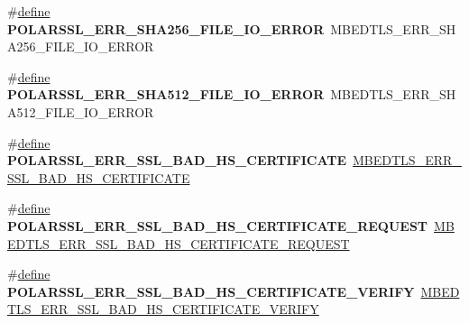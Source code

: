 \begin{DoxyCompactItemize}
\item 
\mbox{\label{compat-1_83_8h_a3aefddbb99ed99898d7ccd1d58301205}} 
\#\hyperlink{structdefine}{define} {\bfseries P\+O\+L\+A\+R\+S\+S\+L\+\_\+\+E\+R\+R\+\_\+\+S\+H\+A256\+\_\+\+F\+I\+L\+E\+\_\+\+I\+O\+\_\+\+E\+R\+R\+OR}~M\+B\+E\+D\+T\+L\+S\+\_\+\+E\+R\+R\+\_\+\+S\+H\+A256\+\_\+\+F\+I\+L\+E\+\_\+\+I\+O\+\_\+\+E\+R\+R\+OR
\item 
\mbox{\label{compat-1_83_8h_a245abc0d05dcfa853d18d20a28d19ec2}} 
\#\hyperlink{structdefine}{define} {\bfseries P\+O\+L\+A\+R\+S\+S\+L\+\_\+\+E\+R\+R\+\_\+\+S\+H\+A512\+\_\+\+F\+I\+L\+E\+\_\+\+I\+O\+\_\+\+E\+R\+R\+OR}~M\+B\+E\+D\+T\+L\+S\+\_\+\+E\+R\+R\+\_\+\+S\+H\+A512\+\_\+\+F\+I\+L\+E\+\_\+\+I\+O\+\_\+\+E\+R\+R\+OR
\item 
\mbox{\label{compat-1_83_8h_abdc6f709e309ee39f6f1b085ee941a55}} 
\#\hyperlink{structdefine}{define} {\bfseries P\+O\+L\+A\+R\+S\+S\+L\+\_\+\+E\+R\+R\+\_\+\+S\+S\+L\+\_\+\+B\+A\+D\+\_\+\+H\+S\+\_\+\+C\+E\+R\+T\+I\+F\+I\+C\+A\+TE}~\hyperlink{ssl_8h_a99d5367b23365159412220ffd9aad20f}{M\+B\+E\+D\+T\+L\+S\+\_\+\+E\+R\+R\+\_\+\+S\+S\+L\+\_\+\+B\+A\+D\+\_\+\+H\+S\+\_\+\+C\+E\+R\+T\+I\+F\+I\+C\+A\+TE}
\item 
\mbox{\label{compat-1_83_8h_a295157be7847f73e569ac41fb81faa08}} 
\#\hyperlink{structdefine}{define} {\bfseries P\+O\+L\+A\+R\+S\+S\+L\+\_\+\+E\+R\+R\+\_\+\+S\+S\+L\+\_\+\+B\+A\+D\+\_\+\+H\+S\+\_\+\+C\+E\+R\+T\+I\+F\+I\+C\+A\+T\+E\+\_\+\+R\+E\+Q\+U\+E\+ST}~\hyperlink{ssl_8h_a4864e3750b4f379143952215f0b1adc6}{M\+B\+E\+D\+T\+L\+S\+\_\+\+E\+R\+R\+\_\+\+S\+S\+L\+\_\+\+B\+A\+D\+\_\+\+H\+S\+\_\+\+C\+E\+R\+T\+I\+F\+I\+C\+A\+T\+E\+\_\+\+R\+E\+Q\+U\+E\+ST}
\item 
\mbox{\label{compat-1_83_8h_a26bdac13261b618681a39b0a20ebf103}} 
\#\hyperlink{structdefine}{define} {\bfseries P\+O\+L\+A\+R\+S\+S\+L\+\_\+\+E\+R\+R\+\_\+\+S\+S\+L\+\_\+\+B\+A\+D\+\_\+\+H\+S\+\_\+\+C\+E\+R\+T\+I\+F\+I\+C\+A\+T\+E\+\_\+\+V\+E\+R\+I\+FY}~\hyperlink{ssl_8h_aa420bf6b4652f53f178900f42f6e5b10}{M\+B\+E\+D\+T\+L\+S\+\_\+\+E\+R\+R\+\_\+\+S\+S\+L\+\_\+\+B\+A\+D\+\_\+\+H\+S\+\_\+\+C\+E\+R\+T\+I\+F\+I\+C\+A\+T\+E\+\_\+\+V\+E\+R\+I\+FY}
\item 
\mbox{\label{compat-1_83_8h_a1b2917c9869b66d3d7c026b5b0e00652}} 

\end{DoxyCompactItemize}
